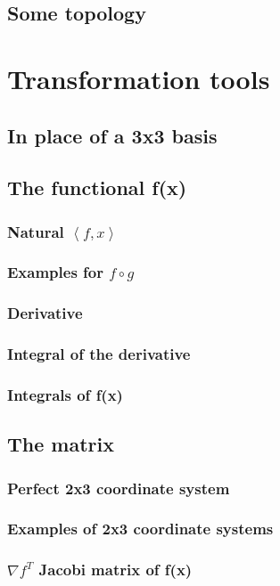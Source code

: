 \documentclass[a4paper]{article}
\begin{document}
\subsection{Some topology}

\section{Transformation tools}
\subsection{In place of a 3x3 basis}
\subsection{The functional f(x)}
\subsubsection{Natural $\left<f,x\right>$}
\subsubsection{Examples for $f \circ g$}
\subsubsection{Derivative}
\subsubsection{Integral of the derivative}
\subsubsection{Integrals of f(x)}

\subsection{The matrix}
\subsubsection{Perfect 2x3 coordinate system}
\subsubsection{Examples of 2x3 coordinate systems}
\subsubsection{$\nabla f ^{T}$ Jacobi matrix of f(x)}
\end{document}
